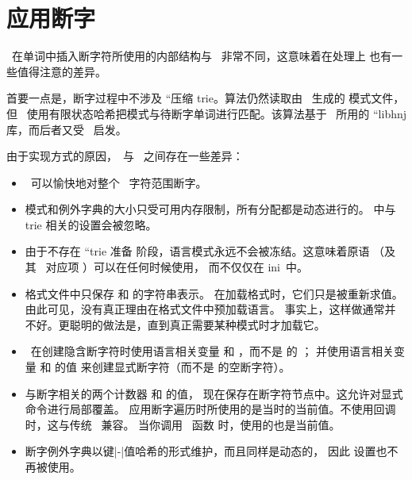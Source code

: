 \section{应用断字}


\LUATEX\ 在单词中插入断字符所使用的内部结构与 \ 非常不同，这意味着在处理上
也有一些值得注意的差异。

首要一点是，断字过程中不涉及 ``压缩 trie。算法仍然读取由 \PATGEN\ 生成的
模式文件，但 \LUATEX\ 使用有限状态哈希把模式与待断字单词进行匹配。该算法基于
\OPENOFFICE\ 所用的 ``libhnj 库，而后者又受 \TEX\ 启发。

由于实现方式的原因，\LUATEX\ 与 \ 之间存在一些差异：

\begin{itemize}\item \LUATEX\ 可以愉快地对整个 \UNICODE\ 字符范围断字。

\item 模式和例外字典的大小只受可用内存限制，所有分配都是动态进行的。
     中与 trie 相关的设置会被忽略。

\item 由于不存在 ``trie 准备 阶段，语言模式永远不会被冻结。这意味着原语
    （及其 \LUA\ 对应项 ）可以在任何时候使用，
    而不仅仅在 ini\TEX\ 中。

\item 格式文件中只保存  和  的字符串表示。
    在加载格式时，它们只是被重新求值。由此可见，没有真正理由在格式文件中预加载语言。
    事实上，这样做通常并不好。更聪明的做法是，直到真正需要某种模式时才加载它。

\item \LUATEX\ 在创建隐含断字符时使用语言相关变量  和
    ，而不是  的 ；
    并使用语言相关变量  和  的值
    来创建显式断字符（而不是  的空断字符）。

\item 与断字相关的两个计数器  和  的值，
    现在保存在断字符节点中。这允许对显式  命令进行局部覆盖。
    应用断字遍历时所使用的是当时的当前值。不使用回调时，这与传统 \TEX\ 兼容。
    当你调用 \LUA\ 函数  时，使用的也是当前值。

\item 断字例外字典以键|-|值哈希的形式维护，而且同样是动态的，
    因此  设置也不再被使用。

\end{itemize}

